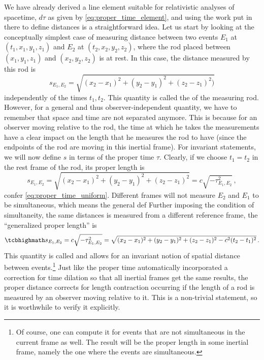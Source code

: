 \documentclass[relativity_main.tex]{subfiles}
\begin{document}
We have already derived a line element suitable for relativistic analyses of spacetime, $d\tau$ as given by \eqref{eq:proper_time_element}, and using the work put in there to define distances is a straightforward idea. Let us start by looking at the conceptually simplest case of measuring distance between two events $E_1$ at $(t_1, x_1, y_1, z_1)$ and $E_2$ at $(t_2, x_2, y_2, z_2)$, where the rod placed between $(x_1, y_1, z_1)$ and $(x_2, y_2, z_2)$ is at rest. In this case, the distance measured by this rod is
\begin{equation}\label{eq:proper_length}
	s_{E_1, E_2} = \sqrt{(x_2 - x_1)^2 + (y_2 - y_1)^2 + (z_2 - z_1)^2)}
\end{equation}
independently of the times $t_1, t_2$. This quantity is called the  of the measuring rod. However, for a general and thus observer-independent quantity, we have to remember that space and time are not separated anymore. This is because for an observer moving relative to the rod, the time at which he takes the measurements have a clear impact on the length that he measures the rod to have (since the endpoints of the rod are moving in this inertial frame). For invariant statements, we will now define $s$ in terms of the proper time $\tau$. Clearly, if we choose $t_1 = t_2$ in the rest frame of the rod, its proper length is
\begin{equation*}
	s_{E_1, E_2} = \sqrt{(x_2 - x_1)^2 + (y_2 - y_1)^2 + (z_2 - z_1)^2} = c \sqrt{- \tau_{E_1, E_2}^2} \, ,
\end{equation*}
confer \eqref{eq:proper_time_uniform}. Different frames will not measure $E_2$ and $E_1$ to be simultaneous, which means the general def Further imposing the condition of simultaneity, the same distances is measured from a different reference frame, the \enquote{generalized proper length} is
\begin{equation}\label{eq:proper_distance_uniform}
	\eqbox{
	s_{E_1, E_2} = c \sqrt{- \tau_{E_1, E_2}^2} = \sqrt{(x_2 - x_1)^2 + (y_2 - y_1)^2 + (z_2 - z_1)^2 - c^2 (t_2 - t_1)^2}
	}\, .
\end{equation}
This quantity is called  and allows for an invariant notion of spatial distance between events.\footnote{Of course, one can compute it for events that are not simultaneous in the current frame as well. The result will be the proper length in some inertial frame, namely the one where the events are simultaneous.} Just like the proper time automatically incorporated a correction for time dilation so that all inertial frames get the same results, the proper distance corrects for length contraction occurring if the length of a rod is measured by an observer moving relative to it. This is a non-trivial statement, so it is worthwhile to verify it explicitly.
\end{document}
